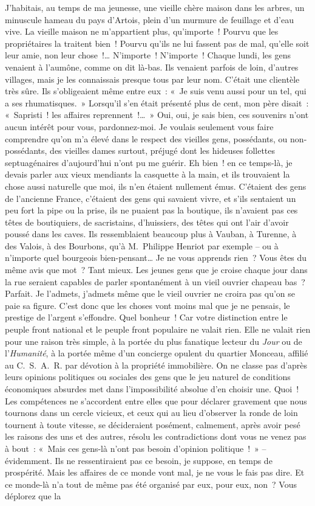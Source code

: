 \documentclass[french,twoside]{book} %
\begin{document}
\bigbreak
\noindent J’habitais, au temps de ma jeunesse, une vieille chère maison dans les arbres, un minuscule hameau du pays d’Artois, plein d’un murmure de feuillage et d’eau vive. La vieille maison ne m’appartient plus, qu’importe ! Pourvu que les propriétaires la traitent bien ! Pourvu qu’ils ne lui fassent pas de mal, qu’elle soit leur amie, non leur chose !… N’importe ! N’importe ! Chaque lundi, les gens venaient à l’aumône, comme on dit là-bas. Ils venaient parfois de loin, d’autres villages, mais je les connaissais presque tous par leur nom. C’était une clientèle très sûre. Ils s’obligeaient même entre eux : « Je suis venu aussi pour un tel, qui a ses rhumatisques. » Lorsqu’il s’en était présenté plus de cent, mon père disait : « Sapristi ! les affaires reprennent !… » Oui, oui, je sais bien, ces souvenirs n’ont aucun intérêt pour vous, pardonnez-moi. Je voulais seulement vous faire comprendre qu’on m’a élevé dans le respect des vieilles gens, possédants, ou non-possédants, des vieilles dames surtout, préjugé dont les hideuses follettes septuagénaires d’aujourd’hui n’ont pu me guérir. Eh bien ! en ce temps-là, je devais parler aux vieux mendiants la casquette à la main, et ils trouvaient la chose aussi naturelle que moi, ils n’en étaient nullement émus. C’étaient des gens de l’ancienne France, c’étaient des gens qui savaient vivre, et s’ils sentaient un peu fort la pipe ou la prise, ils ne puaient pas la boutique, ils n’avaient pas ces têtes de boutiquiers, de sacristains, d’huissiers, des têtes qui ont l’air d’avoir poussé dans les caves. Ils ressemblaient beaucoup plus à Vauban, à Turenne, à des Valois, à des Bourbons, qu’à M. Philippe Henriot par exemple – ou à n’importe quel bourgeois bien-pensant… Je ne vous apprends rien ? Vous êtes du même avis que mot ? Tant mieux. Les jeunes gens que je croise chaque jour dans la rue seraient capables de parler spontanément à un vieil ouvrier chapeau bas ? Parfait. Je l’admets, j’admets même que le vieil ouvrier ne croira pas qu’on se paie sa figure. C’est donc que les choses vont moins mal que je ne pensais, le prestige de l’argent s’effondre. Quel bonheur ! Car votre distinction entre le peuple front national et le peuple front populaire ne valait rien. Elle ne valait rien pour une raison très simple, à la portée du plus fanatique lecteur du \emph{Jour} ou de l’\emph{Humanité}, à la portée même d’un concierge opulent du quartier Monceau, affilié au C. S. A. R. par dévotion à la propriété immobilière. On ne classe pas d’après leurs opinions politiques ou sociales des gens que le jeu naturel de conditions économiques absurdes met dans l’impossibilité absolue d’en choisir une. Quoi ! Les compétences ne s’accordent entre elles que pour déclarer gravement que nous tournons dans un cercle vicieux, et ceux qui au lieu d’observer la ronde de loin tournent à toute vitesse, se décideraient posément, calmement, après avoir pesé les raisons des uns et des autres, résolu les contradictions dont vous ne venez pas à bout : « Mais ces gens-là n’ont pas besoin d’opinion politique ! » – évidemment. Ils ne ressentiraient pas ce besoin, je suppose, en temps de prospérité. Mais les affaires de ce monde vont mal, je ne vous le fais pas dire. Et ce monde-là n’a tout de même pas été organisé par eux, pour eux, non ? Vous déplorez que la 
\end{document}
